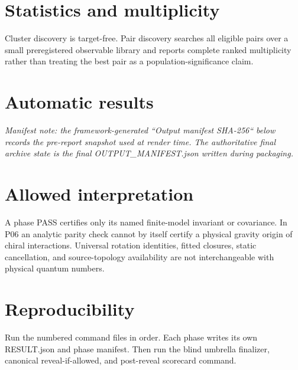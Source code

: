 \documentclass[11pt]{article}
\begin{document}
\section{Statistics and multiplicity}
Cluster discovery is target-free. Pair discovery searches all eligible pairs over a small preregistered observable library and reports complete ranked multiplicity rather than treating the best pair as a population-significance claim.
\section{Automatic results}
{\small
\textit{Manifest note: the framework-generated ``Output manifest SHA-256`` below records the pre-report snapshot used at render time. The authoritative final archive state is the final OUTPUT\_MANIFEST.json written during packaging.}\par
{}
}
\section{Allowed interpretation}
A phase PASS certifies only its named finite-model invariant or covariance. In P06 an analytic parity check cannot by itself certify a physical gravity origin of chiral interactions. Universal rotation identities, fitted closures, static cancellation, and source-topology availability are not interchangeable with physical quantum numbers.
\section{Reproducibility}
Run the numbered command files in order. Each phase writes its own RESULT.json and phase manifest. Then run the blind umbrella finalizer, canonical reveal-if-allowed, and post-reveal scorecard command.
\end{document}
